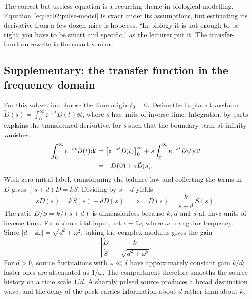 \begin{remark}
The correct-but-useless equation is a recurring theme in biological modelling. Equation~\eqref{eq:lec02:pulse-model} is exact under its assumptions, but estimating its derivative from a few dozen mice is hopeless. ``In biology it is not enough to be right; you have to be smart and specific,'' as the lecturer put it. The transfer-function rewrite is the smart version.
\end{remark}

\subsection{Supplementary: the transfer function in the frequency domain}\label{subsec:lec02:frequency}
For this subsection choose the time origin $t_0=0$. Define the Laplace transform $\tilde D(s)=\int_0^\infty\ee^{-st}D(t)\dd t$, where $s$ has units of inverse time. Integration by parts explains the transformed derivative, for $s$ such that the boundary term at infinity vanishes:
\begin{align}
\int_0^\infty\mathrm{e}^{-st}\dot D(t)\mathrm{d} t
&=\bigl[\mathrm{e}^{-st}D(t)\bigr]_0^\infty+s\int_0^\infty\mathrm{e}^{-st}D(t)\mathrm{d} t\notag\\
&=-D(0)+s\tilde D(s).\label{eq:lec02:laplace-derivative}
\end{align}
With zero initial label, transforming the balance law and collecting the terms in $\tilde D$ gives $(s+d)\tilde D=k\tilde S$. Dividing by $s+d$ yields
\begin{equation}\label{eq:lec02:laplace}
s\tilde D(s)=k\tilde S(s)-d\tilde D(s)
\quad\Longrightarrow\quad
\tilde D(s)=\frac{k}{s+d}\,\tilde S(s).
\end{equation}
The ratio $\tilde D/\tilde S=k/(s+d)$ is dimensionless because $k$, $d$ and $s$ all have units of inverse time. For a sinusoidal input, set $s=\ii\omega$, where $\omega$ is angular frequency. Since $|d+\ii\omega|=\sqrt{d^2+\omega^2}$, taking the complex modulus gives the gain
\begin{equation}\label{eq:lec02:gain}
\left|\frac{\tilde D}{\tilde S}\right|=\frac{k}{\sqrt{d^2+\omega^2}}.
\end{equation}
For $d>0$, source fluctuations with $\omega\ll d$ have approximately constant gain $k/d$; faster ones are attenuated as $1/\omega$. The compartment therefore smooths the source history on a time scale $1/d$. A sharply pulsed source produces a broad destination wave, and the delay of the peak carries information about $d$ rather than about $k$.

